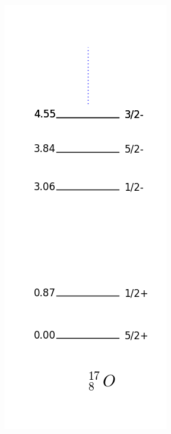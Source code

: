 \documentclass[12pt]{article}
\begin{document}
\begin{figure}
\begin{center}
\includegraphics[scale=0.4]{images/levels_17O.png}

\end{center}
\end{figure}
\end{document}
